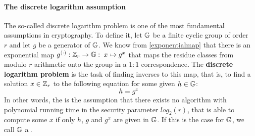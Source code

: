 \paragraph{The discrete logarithm assumption} The so-called discrete logarithm problem is one of the most fundamental assumptions in cryptography. To define it, let $\mathbb{G}$ be a finite cyclic group of order $r$ and let $g$ be a generator of $\mathbb{G}$.  We know from \ref{exponentialmap} that there is an exponential map
$g^{(\cdot)}: \mathbb{Z}_r \to \mathbb{G}:\; x\mapsto g^x$ that maps the residue classes from modulo $r$ arithmetic onto the group in a $1:1$ correspondence. The \textbf{discrete logarithm problem} is the task of finding inverses to this map, that is, to find a solution $x\in\mathbb{Z}_r$ to the following equation for some given $h\in\mathbb{G}$:
\begin{equation}
h = g^x
\end{equation}
In other words, the  is the assumption that there exists no algorithm with polynomial running time  in the security parameter $log_2(r)$, that is able to compute some $x$ if only $h$, $g$ and $g^x$ are given in $\mathbb{G}$. If this is the case for $\mathbb{G}$, we call $\mathbb{G}$ a .

